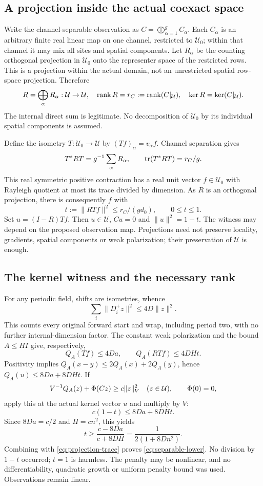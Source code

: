\subsection{A projection inside the actual coexact space}
Write the channel-separable observation as
$C=\bigoplus_{\alpha=1}^g C_\alpha$. Each $C_\alpha$ is an arbitrary
finite real linear map on one channel, restricted to $\mathcal U_0$;
within that channel it may mix all sites and spatial components.
Let $R_\alpha$ be the counting orthogonal projection in $\mathcal U_0$
onto the representer space of the restricted rows. This is a projection
within the actual domain, not an unrestricted spatial row-space
projection. Therefore
\[
 R=\bigoplus_\alpha R_\alpha:\mathcal U\to\mathcal U,
 \quad \operatorname{rank} R=r_C:=\operatorname{rank}(C|_{\mathcal U}),\quad
 \ker R=\ker(C|_{\mathcal U}).
\]
The internal direct sum is legitimate. No decomposition of $\mathcal U_0$
by its individual spatial components is assumed.

Define the isometry $T:\mathcal U_0\to\mathcal U$ by
$(Tf)_\alpha=v_\alpha f$. Channel separation gives
\begin{equation}\label{eq:projection-trace}
 T^*RT=g^{-1}\sum_\alpha R_\alpha,\qquad
 \operatorname{tr}(T^*RT)=r_C/g.
\end{equation}
This real symmetric positive contraction has a real unit vector
$f\in\mathcal U_0$ with Rayleigh quotient at most its trace divided by
dimension. As $R$ is an orthogonal projection, there is consequently $f$ with
\[
 t:=\|RTf\|^2\le r_C/(gd_0),\qquad0\le t\le1.
\]
Set $u=(I-R)Tf$. Then $u\in\mathcal U$, $Cu=0$ and
$\|u\|^2=1-t$. The witness may depend on the proposed observation map.
Projections need not preserve locality, gradients, spatial components or
weak polarization; their preservation of $\mathcal U$ is enough.

\subsection{The kernel witness and the necessary rank}
For any periodic field, shifts are isometries, whence
\[
 \sum_i\|D_i^+z\|^2\le4D\|z\|^2.
\]
This counts every original forward start and wrap, including period two,
with no further internal-dimension factor. The constant weak polarization
and the bound $A\le H I$ give, respectively,
\[
 Q_A(Tf)\le4Da,\qquad Q_A(RTf)\le4DHt.
\]
Positivity implies $Q_A(x-y)\le2Q_A(x)+2Q_A(y)$, hence
$Q_A(u)\le8Da+8DHt$. If
\[
 V^{-1}Q_A(z)+\Phi(Cz)\ge c\|z\|_{V}^2\quad(z\in\mathcal U),
 \qquad \Phi(0)=0,
\]
apply this at the actual kernel vector $u$ and multiply by $V$:
\[
 c(1-t)\le8Da+8DHt.
\]
Since $8Da=c/2$ and $H=cn^2$, this yields
\[
 t\ge\frac{c-8Da}{c+8DH}=\frac1{2(1+8Dn^2)}.
\]
Combining with \eqref{eq:projection-trace} proves
\eqref{eq:separable-lower}. No division by $1-t$ occurred; $t=1$ is
harmless. The penalty may be nonlinear, and no differentiability,
quadratic growth or uniform penalty bound was used. Observations remain linear.

